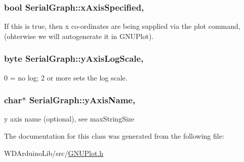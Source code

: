 \subsubsection[{x\+Axis\+Specified}]{\setlength{\rightskip}{0pt plus 5cm}bool Serial\+Graph\+::x\+Axis\+Specified\hspace{0.3cm}{\ttfamily [protected]}, {\ttfamily [inherited]}}\label{class_serial_graph_a4dbd9cf190c591fb4f2f46a50d937199}
If this is true, then x co-\/ordinates are being supplied via the plot command, (ohterwise we will autogenerate it in G\+N\+U\+Plot). \hypertarget{class_serial_graph_a1f0424857ec14c176747b3ddb0768eee}{}
\subsubsection[{y\+Axis\+Log\+Scale}]{\setlength{\rightskip}{0pt plus 5cm}byte Serial\+Graph\+::y\+Axis\+Log\+Scale\hspace{0.3cm}{\ttfamily [protected]}, {\ttfamily [inherited]}}\label{class_serial_graph_a1f0424857ec14c176747b3ddb0768eee}
0 = no log; 2 or more sets the log scale. \hypertarget{class_serial_graph_a08452a56c74ec5f5473b64605d555339}{}
\subsubsection[{y\+Axis\+Name}]{\setlength{\rightskip}{0pt plus 5cm}char$\ast$ Serial\+Graph\+::y\+Axis\+Name\hspace{0.3cm}{\ttfamily [protected]}, {\ttfamily [inherited]}}\label{class_serial_graph_a08452a56c74ec5f5473b64605d555339}
y axis name (optional), see max\+String\+Size 

The documentation for this class was generated from the following file\+:\begin{DoxyCompactItemize}
\item 
W\+D\+Arduino\+Lib/src/\hyperlink{_g_n_u_plot_8h}{G\+N\+U\+Plot.\+h}\end{DoxyCompactItemize}
